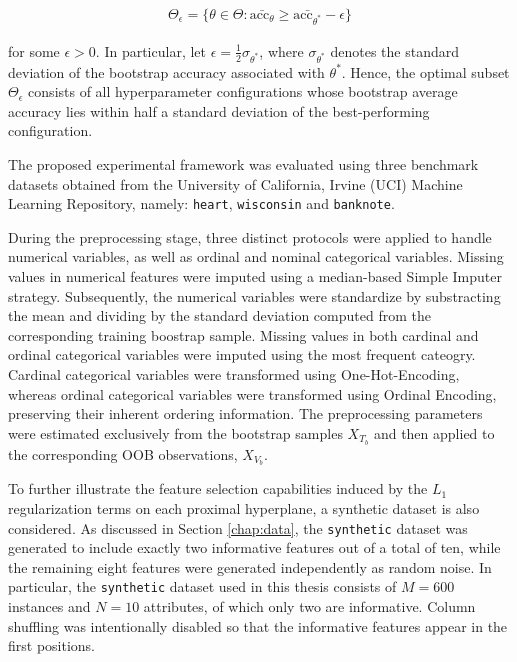 \documentclass[12pt]{report} %
\begin{document}
\begin{align}
\Theta_{\epsilon} = \{\theta \in \Theta : \bar{\text{acc}_{\theta}} \geq \bar{\text{acc}_{\theta^*}} - \epsilon\}
\end{align}

for some $\epsilon > 0$. In particular, let $\epsilon = \frac{1}{2}\sigma_{\theta^*}$, where $\sigma_{\theta^{*}}$ denotes the standard deviation of the bootstrap accuracy associated with $\theta^{*}$. Hence, the optimal subset $\Theta_{\epsilon}$ consists of all hyperparameter configurations whose bootstrap average accuracy lies within half a standard deviation of the best-performing configuration.

The proposed experimental framework was evaluated using three benchmark datasets obtained from the University of California, Irvine (UCI) Machine Learning Repository, namely: \texttt{heart}, \texttt{wisconsin} and \texttt{banknote}.

During the preprocessing stage, three distinct protocols were applied to handle numerical variables, as well as ordinal and nominal categorical variables. Missing values in numerical features were imputed using a median-based Simple Imputer strategy. Subsequently, the numerical variables were standardize by substracting the mean and dividing by the standard deviation computed from the corresponding training boostrap sample. Missing values in both cardinal and ordinal categorical variables were imputed using the most frequent cateogry. Cardinal categorical variables were transformed using One-Hot-Encoding, whereas ordinal categorical variables were transformed using Ordinal Encoding, preserving their inherent ordering information. The preprocessing parameters were estimated exclusively from the bootstrap samples $X_{T_b}$ and then applied to the corresponding OOB observations, $X_{V_b}$.

To further illustrate the feature selection capabilities induced by the $L_1$ regularization terms on each proximal hyperplane, a synthetic dataset is also considered. As discussed in Section \ref{chap:data}, the \texttt{synthetic} dataset was generated to include exactly two informative features out of a total of ten, while the remaining eight features were generated independently as random noise. In particular, the \texttt{synthetic} dataset used in this thesis consists of $M=600$ instances and $N=10$ attributes, of which only two are informative. Column shuffling was intentionally disabled so that the informative features appear in the first positions.
\end{document}
